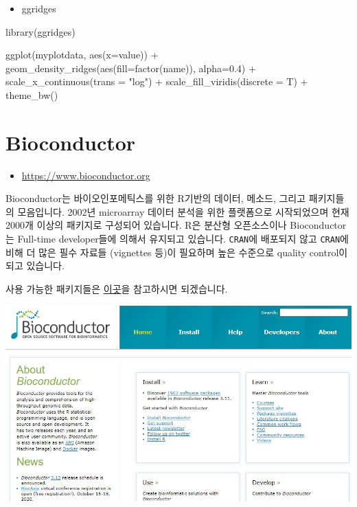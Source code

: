 \documentclass[
]{book}
\newenvironment{Shaded}{\begin{snugshade}}{\end{snugshade}}
\newcommand{\AttributeTok}[1]{\textcolor[rgb]{0.77,0.63,0.00}{#1}}
\newcommand{\FloatTok}[1]{\textcolor[rgb]{0.00,0.00,0.81}{#1}}
\newcommand{\FunctionTok}[1]{\textcolor[rgb]{0.00,0.00,0.00}{#1}}
\newcommand{\NormalTok}[1]{#1}
\newcommand{\SpecialCharTok}[1]{\textcolor[rgb]{0.00,0.00,0.00}{#1}}
\newcommand{\StringTok}[1]{\textcolor[rgb]{0.31,0.60,0.02}{#1}}
\providecommand{\tightlist}{%
  \setlength{\itemsep}{0pt}\setlength{\parskip}{0pt}}
\begin{document}
\begin{itemize}
\tightlist
\item
  ggridges
\end{itemize}

\begin{Shaded}
\begin{Highlighting}[]
\FunctionTok{library}\NormalTok{(ggridges)}

\FunctionTok{ggplot}\NormalTok{(myplotdata, }\FunctionTok{aes}\NormalTok{(}\AttributeTok{x=}\NormalTok{value)) }\SpecialCharTok{+}
  \FunctionTok{geom\_density\_ridges}\NormalTok{(}\FunctionTok{aes}\NormalTok{(}\AttributeTok{fill=}\FunctionTok{factor}\NormalTok{(name)), }\AttributeTok{alpha=}\FloatTok{0.4}\NormalTok{) }\SpecialCharTok{+}
  \FunctionTok{scale\_x\_continuous}\NormalTok{(}\AttributeTok{trans =} \StringTok{"log"}\NormalTok{) }\SpecialCharTok{+}
  \FunctionTok{scale\_fill\_viridis}\NormalTok{(}\AttributeTok{discrete =}\NormalTok{ T) }\SpecialCharTok{+}
  \FunctionTok{theme\_bw}\NormalTok{()}
\end{Highlighting}
\end{Shaded}

\hypertarget{bioconductor}{%
\chapter{Bioconductor}\label{bioconductor}}

\begin{itemize}
\tightlist
\item
  \url{https://www.bioconductor.org}
\end{itemize}

Bioconductor는 바이오인포메틱스를 위한 R기반의 데이터, 메소드, 그리고 패키지들의 모음입니다. 2002년 microarray 데이터 분석을 위한 플랫폼으로 시작되었으며 현재 2000개 이상의 패키지로 구성되어 있습니다. R은 분산형 오픈소스이나 Bioconductor는 Full-time developer들에 의해서 유지되고 있습니다. \texttt{CRAN}에 배포되지 않고 \texttt{CRAN}에 비해 더 많은 필수 자료들 (vignettes 등)이 필요하며 높은 수준으로 quality control이 되고 있습니다.

사용 가능한 패키지들은 \href{http://bioconductor.org/packages/release/BiocViews.html\#___Software}{이곳}을 참고하시면 되겠습니다.

\includegraphics[width=6.25in,height=\textheight]{images/04/bioconductor.JPG}
\end{document}
